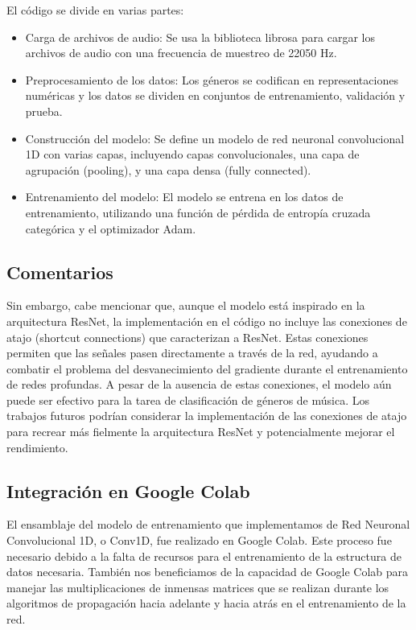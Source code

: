 \documentclass[colorinlistoftodos,twoside,twocolumn,10pt]{article} %
\begin{document}
El código se divide en varias partes:
\begin{itemize}
\item Carga de archivos de audio: Se usa la biblioteca librosa para cargar los archivos de audio con una frecuencia de muestreo de 22050 Hz.
\item Preprocesamiento de los datos: Los géneros se codifican en representaciones numéricas y los datos se dividen en conjuntos de entrenamiento, validación y prueba.
\item Construcción del modelo: Se define un modelo de red neuronal convolucional 1D con varias capas, incluyendo capas convolucionales, una capa de agrupación (pooling), y una capa densa (fully connected).
\item Entrenamiento del modelo: El modelo se entrena en los datos de entrenamiento, utilizando una función de pérdida de entropía cruzada categórica y el optimizador Adam.
\end{itemize}

\subsection{Comentarios}
Sin embargo, cabe mencionar que, aunque el modelo está inspirado en la arquitectura ResNet, la implementación en el código no incluye las conexiones de atajo (shortcut connections) que caracterizan a ResNet. Estas conexiones permiten que las señales pasen directamente a través de la red, ayudando a combatir el problema del desvanecimiento del gradiente durante el entrenamiento de redes profundas. A pesar de la ausencia de estas conexiones, el modelo aún puede ser efectivo para la tarea de clasificación de géneros de música. Los trabajos futuros podrían considerar la implementación de las conexiones de atajo para recrear más fielmente la arquitectura ResNet y potencialmente mejorar el rendimiento.

\subsection*{Integración en Google Colab}

El ensamblaje del modelo de entrenamiento que implementamos de Red Neuronal Convolucional 1D, o Conv1D, fue realizado en Google Colab. Este proceso fue necesario debido a la falta de recursos para el entrenamiento de la estructura de datos necesaria. También nos beneficiamos de la capacidad de Google Colab para manejar las multiplicaciones de inmensas matrices que se realizan durante los algoritmos de propagación hacia adelante y hacia atrás en el entrenamiento de la red.
\end{document}
